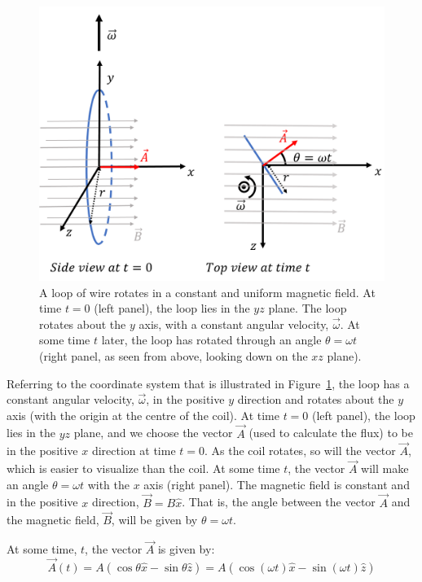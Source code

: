 \begin{figure}[!htbp]
\centering
\includegraphics[width=0.6\linewidth]{files/generator-d90ce872c1eb265a4b57a78c94dce269.png}
\caption[]{A loop of wire rotates in a constant and uniform magnetic field. At time $t=0$ (left panel), the loop lies in the $yz$ plane. The loop rotates about the $y$ axis, with a constant angular velocity, $\vec \omega$. At some time $t$ later, the loop has rotated through an angle $\theta = \omega t$ (right panel, as seen from above, looking down on the $xz$ plane).}
\label{fig:induction:generator}
\end{figure}

Referring to the coordinate system that is illustrated in Figure~\ref{fig:induction:generator}, the loop has a constant angular velocity, $\vec\omega$, in the positive $y$ direction and rotates about the $y$ axis (with the origin at the centre of the coil). At time $t=0$ (left panel), the loop lies in the $yz$ plane, and we choose the vector $\vec A$ (used to calculate the flux) to be in the positive $x$ direction at time $t=0$. As the coil rotates, so will the vector $\vec A$, which is easier to visualize than the coil. At some time $t$, the vector $\vec A$ will make an angle $\theta=\omega t$ with the $x$ axis (right panel). The magnetic field is constant and in the positive $x$ direction, $\vec B = B\hat x$. That is, the angle between the vector $\vec A$ and the magnetic field, $\vec B$, will be given by $\theta = \omega t$.

At some time, $t$, the vector $\vec A$ is given by:
\begin{equation}
\vec A(t) = A(\cos\theta \hat x -\sin\theta \hat z) = A(\cos(\omega t) \hat x -\sin(\omega t)\hat z)
\end{equation}

